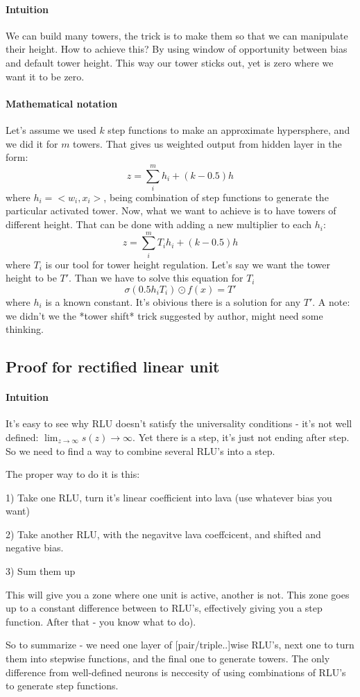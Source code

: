 \documentclass{article}
\begin{document}
\paragraph{Intuition}
We can build many towers, the trick is to make them so that we can manipulate their height.
How to achieve this? By using window of opportunity between bias and default tower height.
This way our tower sticks out, yet is zero where we want it to be zero.

\paragraph{Mathematical notation}
Let's assume we used $k$ step functions to make an approximate hypersphere, and we did it for $m$ towers.
That gives us weighted output from hidden layer in the form:
$$z = \sum_i^m h_i + (k-0.5)h$$
where $h_i = <w_i, x_i>$, being combination of step functions to generate the particular activated tower.
Now, what we want to achieve is to have towers of different height.
That can be done with adding a new multiplier to each $h_i$:
$$z = \sum_i^m T_i h_i + (k-0.5)h$$
where $T_i$ is our tool for tower height regulation. 
Let's say we want the tower height to be $T'$. Than we have to solve this equation for $T_i$
$$\sigma(0.5 h_i T_i) \odot f(x) = T'$$
where $h_i$ is a known constant. It's obivious there is a solution for any $T'$.
A note: we didn't we the *tower shift* trick suggested by author, might need some thinking.

\subsection{Proof for rectified linear unit}
\paragraph{Intuition}
It's easy to see why RLU doesn't satisfy the universality conditions - it's not well defined:
$\lim_{z \rightarrow \infty} s(z) \rightarrow \infty$.
Yet there is a step, it's just not ending after step. So we need to find a way to combine several RLU's into a step.

The proper way to do it is this:

1) Take one RLU, turn it's linear coefficient into lava (use whatever bias you want)

2) Take another RLU, with the negavitve lava coeffcicent, and shifted and negative bias. 

3) Sum them up

This will give you a zone where one unit is active, another is not. This zone goes up to a constant difference between to RLU's, 
effectively giving you a step function.
After that - you know what to do). 

So to summarize - we need one layer of [pair/triple..]wise RLU's, next one to turn them into stepwise functions, and the final one to generate towers.
The only difference from well-defined neurons is neccesity of using combinations of RLU's to generate step functions.
\end{document}
